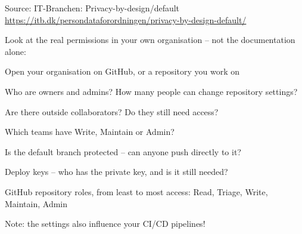 \documentclass[Screen16to9,17pt]{foils}
\begin{document}
Source: IT-Branchen: Privacy-by-design/default\\ \url{https://itb.dk/persondataforordningen/privacy-by-design-default/}



Look at the real permissions in your own organisation -- not the documentation alone:
\begin{list2}
\item Open your organisation on GitHub, or a repository you work on
\item Who are owners and admins? How many people can change repository settings?
\item Are there outside collaborators? Do they still need access?
\item Which teams have Write, Maintain or Admin?
\item Is the default branch protected -- can anyone push directly to it?
\item Deploy keys -- who has the private key, and is it still needed?
\end{list2}

GitHub repository roles, from least to most access: Read, Triage, Write, Maintain, Admin\\
{\footnotesize{}}

Note: the settings also influence your CI/CD pipelines!

\breakdance



\end{document}
